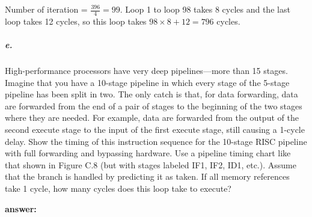 \documentclass{article}
\begin{document}
\begin{figure}[!ht]
\end{figure}

Number of iteration = $\frac{396}{4}=99$. Loop 1 to loop 98 takes 8 cycles and the last loop takes 12 cycles, so this loop takes $98\times 8+12=796$ cycles.

\subparagraph{e.} High-performance processors have very deep pipelines—more than 15 stages. Imagine that you have a 10-stage pipeline in which every stage of the 5-stage pipeline has been split in two. The only catch is that, for data forwarding, data are forwarded from the end of a pair of stages to the beginning of the two stages where they are needed. For example, data are forwarded from the output of the second execute stage to the input of the first execute stage, still causing a 1-cycle delay. Show the timing of this instruction sequence for the 10-stage RISC pipeline with full forwarding and bypassing hardware. Use a pipeline timing chart like that shown in Figure C.8 (but with stages labeled IF1, IF2, ID1, etc.). Assume that the branch is handled by predicting it as taken. If all memory references take 1 cycle, how many cycles does this loop take to execute?

\noindent \textbf{answer:} 
\end{document}
